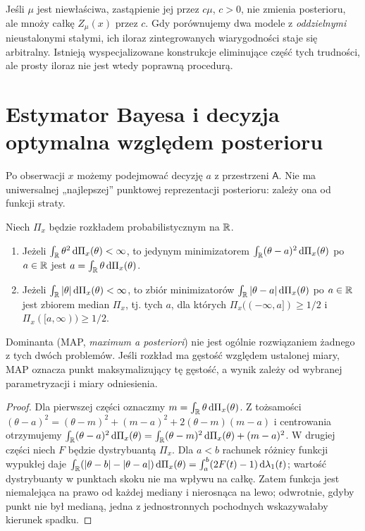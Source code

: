 \begin{uwaga}
Jeśli $\mu$ jest niewłaściwa, zastąpienie jej przez $c\mu$, $c>0$,
nie zmienia posterioru, ale mnoży całkę $Z_\mu(x)$ przez $c$.
Gdy porównujemy dwa modele z \emph{oddzielnymi} nieustalonymi
stałymi, ich iloraz zintegrowanych wiarygodności staje się
arbitralny. Istnieją wyspecjalizowane konstrukcje eliminujące część
tych trudności, ale prosty iloraz nie jest wtedy poprawną procedurą.
\end{uwaga}

\section{Estymator Bayesa i decyzja optymalna względem posterioru}
Po obserwacji $x$ możemy podejmować decyzję $a$ z przestrzeni
$\mathsf A$. Nie ma uniwersalnej „najlepszej” punktowej reprezentacji
posterioru: zależy ona od funkcji straty.

\begin{twierdzenie}
\label{thm:bayes-actions}
Niech $\Pi_x$ będzie rozkładem probabilistycznym na $\mathbb R$.
\begin{enumerate}
\item Jeżeli $\int_\mathbb R\theta^2\,\mathrm d\Pi_x(\theta)<\infty$, to
jedynym minimizatorem $\int_\mathbb R(\theta-a)^2\,\mathrm d\Pi_x(\theta)$
po $a\in\mathbb R$ jest $a=\int_\mathbb R\theta\,\mathrm d\Pi_x(\theta)$.
\item Jeżeli $\int_\mathbb R|\theta|\,\mathrm d\Pi_x(\theta)<\infty$,
to zbiór minimizatorów $\int_\mathbb R|\theta-a|\,\mathrm d\Pi_x(\theta)$
po $a\in\mathbb R$ jest zbiorem median $\Pi_x$, tj. tych $a$, dla których
$\Pi_x(({-}\infty,a])\ge1/2$ i $\Pi_x([a,\infty))\ge1/2$.
\end{enumerate}
Dominanta (MAP, \emph{maximum a posteriori}) nie jest ogólnie
rozwiązaniem żadnego z tych dwóch problemów. Jeśli rozkład ma gęstość
względem ustalonej miary, MAP oznacza punkt maksymalizujący tę gęstość,
a wynik zależy od wybranej parametryzacji i miary odniesienia.
\end{twierdzenie}
\begin{proof}
Dla pierwszej części oznaczmy $m=\int_\mathbb R\theta\,\mathrm d\Pi_x(\theta)$.
Z tożsamości $(\theta-a)^2=(\theta-m)^2+(m-a)^2
+2(\theta-m)(m-a)$ i centrowania otrzymujemy
$\int_\mathbb R(\theta-a)^2\,\mathrm d\Pi_x(\theta)
=\int_\mathbb R(\theta-m)^2\,\mathrm d\Pi_x(\theta)+(m-a)^2$.
W drugiej części niech $F$ będzie dystrybuantą $\Pi_x$.
Dla $a<b$ rachunek różnicy funkcji wypukłej daje
$\int_\mathbb R (|\theta-b|-|\theta-a|)\,\mathrm d\Pi_x(\theta)
=\int_a^b(2F(t)-1)\,\mathrm d\lambda_1(t)$;
wartość dystrybuanty w punktach skoku nie ma wpływu na całkę.
Zatem funkcja jest niemalejąca na prawo od każdej mediany
i nierosnąca na lewo; odwrotnie, gdyby punkt nie był medianą,
jedna z jednostronnych pochodnych wskazywałaby kierunek spadku.
\end{proof}

